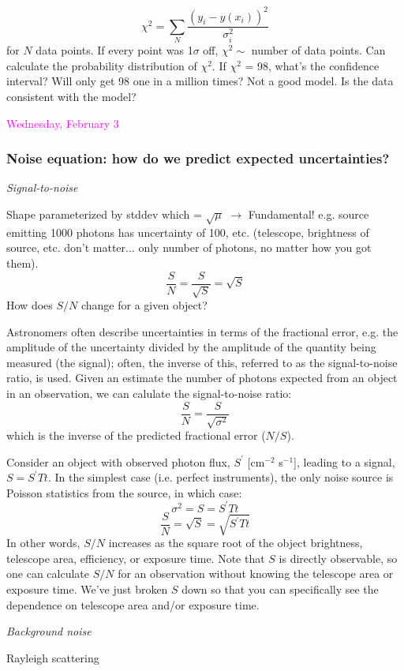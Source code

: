\documentclass[12pt]{article}
\begin{document}
\textcolor{myBlue}{
    $$  \chi^2 = \sum_N \frac{(y_i-y(x_i))^2}{\sigma_i^2} $$
for $N$ data points. If every point was 1$\sigma$ off,
$\chi^2 \sim$ number of data points. Can calculate the probability
distribution of $\chi^2$. If $\chi^2$ = 98, what's the confidence
interval? Will only get 98 one in a million times? Not a good model.
Is the data consistent with the model?
}

\textcolor{magenta}{Wednesday, February 3}
\subsubsection*{Noise equation: how do we predict expected
uncertainties?}
\emph{Signal-to-noise}

\textcolor{myBlue}{
Shape parameterized by stddev which = $\sqrt{\mu}$
$\rightarrow$ Fundamental! e.g. source emitting 1000 photons has
uncertainty of 100, etc. (telescope, brightness of source, etc. don't
matter$\ldots$ only number of photons, no matter how you got them).
    $$ \frac{S}{N} = \frac{S}{\sqrt{S}} = \sqrt{S} $$
How does $S/N$ change for a given object?
}

Astronomers often describe uncertainties in terms of the fractional
error, e.g. the amplitude of the uncertainty divided by the amplitude
of the quantity being measured (the signal);
often, the inverse of this, referred
to as the signal-to-noise ratio, is used. Given an estimate the number
of photons expected from an object in an observation, we can calulate
the signal-to-noise ratio:
    $$ \frac{S}{N} = \frac{S}{\sqrt{\sigma^2}} $$
which is the inverse of the predicted fractional error ($N/S$).

Consider an object with observed photon flux, $S^{\prime}$
[cm$^{-2}$ s$^{-1}$],
leading to a signal, $S = S^{\prime}Tt$.
In the simplest case (i.e. perfect
instruments), the only noise
source is Poisson statistics from the source, in which case:
    $$ \sigma^2 = S = S^{\prime}Tt $$
    $$ \frac{S}{N} = \sqrt{S} = \sqrt{S^{\prime}Tt} $$
In other words, $S/N$ increases as the square root of the object
brightness, telescope area, efficiency, or exposure time. Note that $S$
is directly observable, so one can calculate $S/N$ for an
observation without knowing the telescope area or exposure time.
We've just broken $S$ down so that you can specifically see the dependence on
telescope area and/or exposure time.

\emph{Background noise}

\textcolor{myBlue}{Rayleigh scattering}
\end{document}
